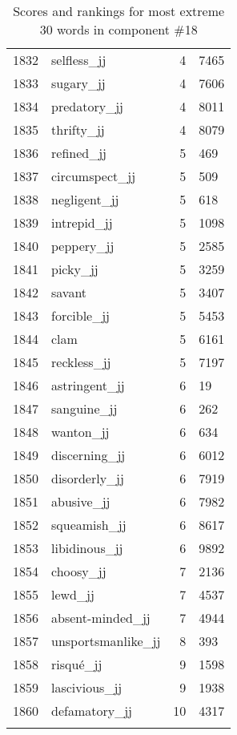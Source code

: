 \begin{longtable}[!htbp]{| rlr@{.}l |}
    1832 & selfless\_jj & 4 & 7465 \\
    1833 & sugary\_jj & 4 & 7606 \\
    1834 & predatory\_jj & 4 & 8011 \\
    1835 & thrifty\_jj & 4 & 8079 \\
    1836 & refined\_jj & 5 & 469 \\
    1837 & circumspect\_jj & 5 & 509 \\
    1838 & negligent\_jj & 5 & 618 \\
    1839 & intrepid\_jj & 5 & 1098 \\
    1840 & peppery\_jj & 5 & 2585 \\
    1841 & picky\_jj & 5 & 3259 \\
    1842 & savant & 5 & 3407 \\
    1843 & forcible\_jj & 5 & 5453 \\
    1844 & clam & 5 & 6161 \\
    1845 & reckless\_jj & 5 & 7197 \\
    1846 & astringent\_jj & 6 & 19 \\
    1847 & sanguine\_jj & 6 & 262 \\
    1848 & wanton\_jj & 6 & 634 \\
    1849 & discerning\_jj & 6 & 6012 \\
    1850 & disorderly\_jj & 6 & 7919 \\
    1851 & abusive\_jj & 6 & 7982 \\
    1852 & squeamish\_jj & 6 & 8617 \\
    1853 & libidinous\_jj & 6 & 9892 \\
    1854 & choosy\_jj & 7 & 2136 \\
    1855 & lewd\_jj & 7 & 4537 \\
    1856 & absent-minded\_jj & 7 & 4944 \\
    1857 & unsportsmanlike\_jj & 8 & 393 \\
    1858 & risqué\_jj & 9 & 1598 \\
    1859 & lascivious\_jj & 9 & 1938 \\
    1860 & defamatory\_jj & 10 & 4317 \\
    \hline
    \caption{Scores and rankings for most extreme 30 words in component \#18} \\
\end{longtable}
